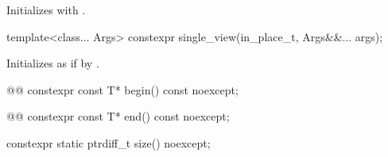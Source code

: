 {\begin{itemdescr}
\pnum
\effects Initializes  with .
\end{itemdescr}

%
\begin{itemdecl}
template<class... Args>
constexpr single_view(in_place_t, Args&&... args);
\end{itemdecl}

\begin{itemdescr}
\pnum
\effects Initializes  as if by
.
\end{itemdescr}

%
\begin{itemdecl}
@@
constexpr const T* begin() const noexcept;
\end{itemdecl}

\begin{itemdescr}
\pnum
{}

\pnum
{}

\pnum
{}
\end{itemdescr}

%
\begin{itemdecl}
@@
constexpr const T* end() const noexcept;
\end{itemdecl}

\begin{itemdescr}
\pnum
{}

\pnum
{}

\pnum
{}
\end{itemdescr}

%
\begin{itemdecl}
constexpr static ptrdiff_t size() noexcept;
\end{itemdecl}

\begin{itemdescr}
\pnum
{}

\pnum
\oldtxt{\returns}  
\end{itemdescr}

}
